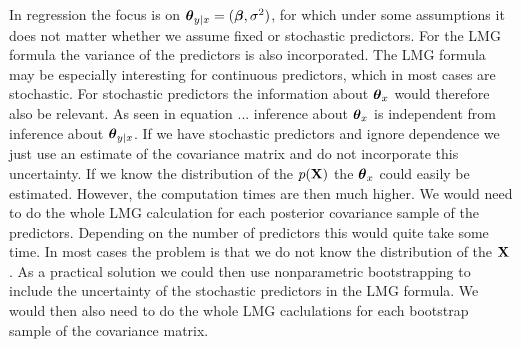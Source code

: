 \documentclass[11pt,a4paper,twoside]{book}
\begin{document}
  In regression the focus is on ${\boldsymbol{\theta}}{}_{y \mid x} = ({\boldsymbol{\beta}}, \sigma^2)$, for which under some assumptions it does not matter whether we assume fixed or stochastic predictors. For the LMG formula the variance of the predictors is also incorporated. The LMG formula may be especially interesting for continuous predictors, which in most cases are stochastic. For stochastic predictors the information about ${\boldsymbol{\theta}}{}_{x}$ would therefore also be relevant.  As seen in equation ... inference about ${\boldsymbol{\theta}}{}_{x}$  is independent from inference about ${\boldsymbol{\theta}}{}_{y \mid x}$. If we have stochastic predictors and ignore dependence we just use an estimate of the covariance matrix and do not incorporate this uncertainty. If we know the distribution of the $p({\mathbf{X}})$ the ${\boldsymbol{\theta}}{}_{x}$ could easily be estimated. However, the computation times are then much higher. We would need to do the whole LMG calculation for each posterior covariance sample of the predictors. Depending on the number of predictors this would quite take some time.  In most cases the problem is that we do not know the distribution of the ${\mathbf{X}}$. As a practical solution we could then use nonparametric bootstrapping to include the uncertainty of the stochastic predictors in the LMG formula. We would then also need to do the whole LMG caclulations for each bootstrap sample of the covariance matrix. 
  
  
  
  
  
  
  
  
  

  
  
  
  
  
  
  
  
  











  
  
  
 
   
   
   
   
   

 

\end{document}
